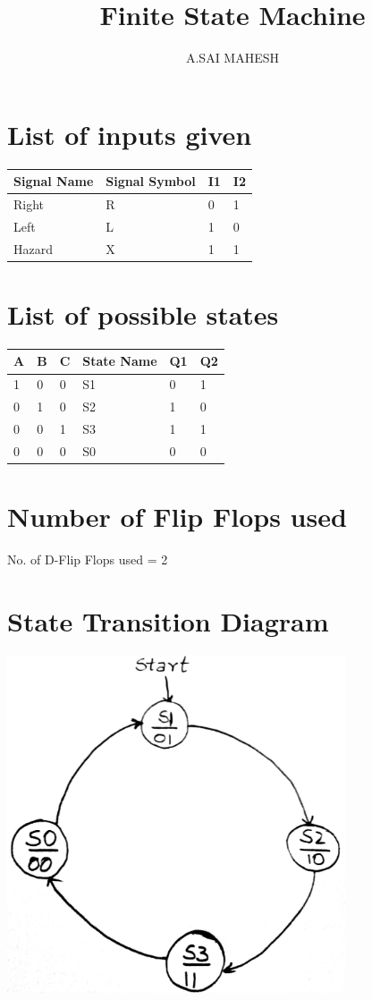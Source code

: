 \documentclass[12pt]{article}
\title{Finite State Machine}
\author{A.SAI MAHESH}
\begin{document}
\maketitle
\centering
\section{List of inputs given}
\begin{table}[h]
\centering
\begin{tabular}{|l|l|l|l|}
\hline
Signal Name & Signal Symbol & I1 & I2\\
\hline
Right & R & 0 & 1\\
\hline
Left & L & 1 & 0\\
\hline
Hazard & X & 1 & 1\\
\hline
\end{tabular}
\end{table}
\section{List of possible states}
\begin{table}[h]
\centering
\begin{tabular}{|l|l|l|p{2cm}|l|l|}
\hline
A & B & C & State Name & Q1 & Q2\\
\hline
1 & 0 & 0 & S1 & 0 & 1\\
\hline
0 & 1 & 0 & S2 & 1 & 0\\
\hline
0 & 0 & 1 & S3 & 1 & 1\\
\hline
0 & 0 & 0 & S0 & 0 & 0\\
\hline
\end{tabular}
\end{table}
\section{Number of Flip Flops used}
No. of D-Flip Flops used = 2
\section{State Transition Diagram}
\includegraphics[width=10cm,height=10cm]{images/StateTransition.jpg}
\end{document}
